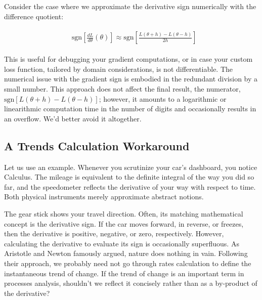 \documentclass[11pt]{book}
\begin{document}
Consider the case where we approximate the derivative sign numerically with the difference quotient:

\begin{align}
&\begin{aligned}
\text{sgn}\left[\frac{dL}{d\theta}\left(\theta\right)\right]\approx \text{sgn}\left[\frac{L\left(\theta+h\right)-L\left(\theta-h\right)}{2h}\right]
\end{aligned}
\end{align}


This is useful for debugging your gradient computations, or in case your custom loss function, tailored by domain considerations, is not differentiable. The numerical issue with the gradient sign is embodied in the redundant division by a small number. This approach does not affect the final result, the numerator, $\text{sgn}\left[L\left(\theta+h\right)-L\left(\theta-h\right)\right]$; however, it amounts to a logarithmic or linearithmic computation time in the number of digits and occasionally results in an overflow. We’d better avoid it altogether.

\subsection{A Trends Calculation Workaround}

Let us use an example. Whenever you scrutinize your car's dashboard, you notice Calculus. The mileage is equivalent to the definite integral of the way you did so far, and the speedometer reflects the derivative of your way with respect to time. Both physical instruments merely approximate abstract notions.

The gear stick shows your travel direction. Often, its matching mathematical concept is the derivative sign. If the car moves forward, in reverse, or freezes, then the derivative is positive, negative, or zero, respectively. However, calculating the derivative to evaluate its sign is occasionally superfluous. As Aristotle and Newton famously argued, nature does nothing in vain. Following their approach, we probably need not go through rates calculation to define the instantaneous trend of change. If the trend of change is an important term in processes analysis, shouldn't we reflect it concisely rather than as a by-product of the derivative?
\end{document}
